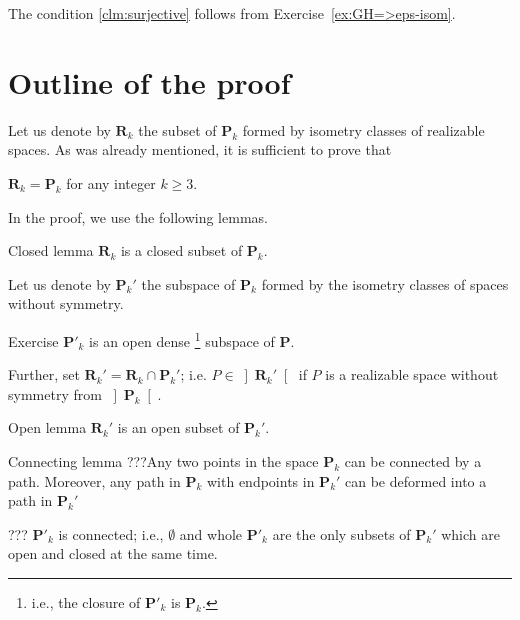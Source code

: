 The condition \ref{clm:surjective} follows from Exercise~\ref{ex:GH=>eps-isom}.
\qeds







\section{Outline of the proof}\label{sec:outline}

Let us denote by $\mathbf{R}_k$ the subset of $\mathbf{P}_k$
formed by isometry classes of realizable spaces.
As was already mentioned, it is sufficient to prove that
\begin{clm}{}
$\mathbf{R}_k=\mathbf{P}_k$ for any integer $k\ge 3$.
\end{clm}

In the proof, we use the following lemmas.

\begin{thm}{Closed lemma}\label{lem:Phi(P)-closed}
$\mathbf{R}_k$ is a closed subset of $\mathbf{P}_k$.
\end{thm}

Let us denote by $\mathbf{P}_k'$ the subspace of $\mathbf{P}_k$
formed by the isometry classes of spaces without symmetry.

\begin{thm}{Exercise}\label{ex:open-dense}
$\mathbf{P}'_k$ is an open dense%
\footnote{i.e., the closure of $\mathbf{P}'_k$ is $\mathbf{P}_k$.}
 subspace of $\mathbf{P}$.
\end{thm}

Further, 
set $\mathbf{R}_k'=\mathbf{R}_k\cap \mathbf{P}_k'$;
i.e. $P\in \left]\mathbf{R}_k'\right[$ if $P$  is a realizable space without symmetry from $\left]\mathbf{P}_k\right[$. 

\begin{thm}{Open lemma}\label{lem:Phi(P)-open}
$\mathbf{R}_k'$ is an open subset of $\mathbf{P}_k'$.
\end{thm}


\begin{thm}{Connecting lemma}\label{lem:Phi(P)-connect}
???Any two points in the space $\mathbf{P}_{k}$ can be connected by a path.
Moreover, any path in $\mathbf{P}_{k}$ with endpoints in $\mathbf{P}_{k}'$
can be deformed into a path in $\mathbf{P}_{k}'$

??? $\mathbf{P}'_{k}$ is connected;
i.e., $\emptyset$ and whole $\mathbf{P}'_{k}$
are the only subsets of $\mathbf{P}_{k}'$ which are open and closed at the same time.
\end{thm}


